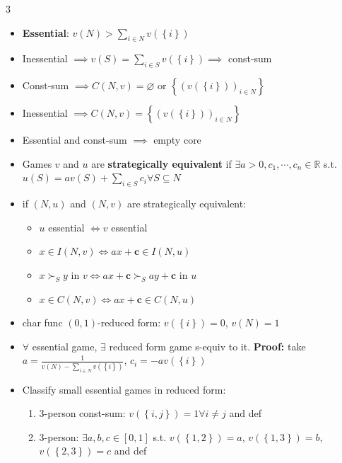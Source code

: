 \documentclass[8pt]{article}
\newcommand{\R}{\mathbb{R}}
\begin{document}
\begin{multicols*}{3}
\begin{itemize}
            \item \textbf{Essential}: $v\left(N\right) > \sum_{i \in N}v\left(\left\{i\right\}\right)$
            \item Inessential $\implies v\left(S\right) = \sum_{i \in S}v\left(\left\{i\right\}\right) \implies$ const-sum
            \item Const-sum $\implies C\left(N, v\right) = \varnothing$ or $\left\{\left(v\left(\left\{i\right\}\right)\right)_{i \in N}\right\}$
            \item Inessential $\implies C\left(N, v\right) = \left\{\left(v\left(\left\{i\right\}\right)\right)_{i \in N}\right\}$
            \item Essential and const-sum $\implies$ empty core
            \item Games $v$ and $u$ are \textbf{strategically equivalent} if $\exists a > 0, c_1, \cdots, c_n \in \R$ s.t. $u\left(S\right) = av\left(S\right) + \sum_{i \in S} c_i \forall S \subseteq N$
            \item if $\left(N, u\right)$ and $\left(N, v\right)$ are strategically equivalent:
            \begin{itemize}
                \setlength\itemsep{0pt}
                \item $u$ essential $\iff v$ essential
                \item $x \in I\left(N, v\right) \iff ax + \bm{c} \in I\left(N, u\right)$
                \item $x \succ_S y$ in $v \iff ax + \bm{c} \succ_S ay + \bm{c}$ in $u$
                \item $x \in C\left(N, v\right) \iff ax + \bm{c} \in C\left(N, u\right)$
            \end{itemize}
            \item char func $\left(0, 1\right)$-reduced form: $v\left(\left\{i\right\}\right) = 0$, $v\left(N\right) = 1$
            \item $\forall$ essential game, $\exists$ reduced form game s-equiv to it. \textbf{Proof:} take $a = \frac{1}{v\left(N\right) - \sum_{i \in N}v\left(\left\{i\right\}\right)}$, $c_i = -av\left(\left\{i\right\}\right)$
            \item Classify small essential games in reduced form:
            \begin{enumerate}
                \setlength\itemsep{0pt}
                \item 3-person const-sum: $v\left(\left\{i, j\right\}\right) = 1 \forall i \neq j$ and def
                \item 3-person: $\exists a, b, c \in \left[0, 1\right]$ s.t. $v\left(\left\{1, 2\right\}\right) = a$, $v\left(\left\{1, 3\right\}\right) = b$, $v\left(\left\{2, 3\right\}\right) = c$ and def 

\end{enumerate}
\end{itemize}
\end{multicols*}
\end{document}
